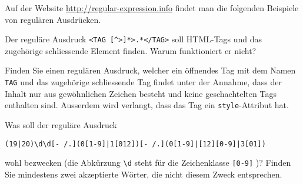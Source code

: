 Auf der Website \url{http://regular-expression.info} findet man die folgenden
Beispiele von regulären Ausdrücken.
\begin{teilaufgaben}
\item
Der reguläre Ausdruck
\verb+<TAG [^>]*>.*</TAG>+
soll HTML-Tags und das zugehörige schliessende Element finden.
Warum funktioniert er nicht?
\item
Finden Sie einen regulären Ausdruck, welcher ein öffnendes Tag mit
dem Namen
\verb+TAG+
und das zugehörige schliessende Tag findet unter
der Annahme, dass der Inhalt nur aus gewöhnlichen Zeichen besteht und
keine geschachtelten Tags enthalten sind.
Ausserdem wird verlangt, dass das Tag ein \texttt{style}-Attribut hat.
\item
Was soll der reguläre Ausdruck
\begin{verbatim}
(19|20)\d\d[- /.](0[1-9]|1[012])[- /.](0[1-9]|[12][0-9]|3[01])
\end{verbatim}
wohl bezwecken (die Abkürzung \verb+\d+ steht für die Zeichenklasse
\verb+[0-9]+%
)?
Finden Sie mindestens zwei akzeptierte Wörter, die nicht diesem Zweck
entsprechen.
\end{teilaufgaben}

